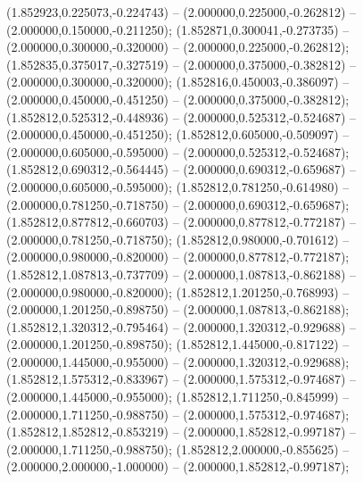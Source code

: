  (1.852923,0.225073,-0.224743) -- (2.000000,0.225000,-0.262812) -- (2.000000,0.150000,-0.211250);
 (1.852871,0.300041,-0.273735) -- (2.000000,0.300000,-0.320000) -- (2.000000,0.225000,-0.262812);
 (1.852835,0.375017,-0.327519) -- (2.000000,0.375000,-0.382812) -- (2.000000,0.300000,-0.320000);
 (1.852816,0.450003,-0.386097) -- (2.000000,0.450000,-0.451250) -- (2.000000,0.375000,-0.382812);
 (1.852812,0.525312,-0.448936) -- (2.000000,0.525312,-0.524687) -- (2.000000,0.450000,-0.451250);
 (1.852812,0.605000,-0.509097) -- (2.000000,0.605000,-0.595000) -- (2.000000,0.525312,-0.524687);
 (1.852812,0.690312,-0.564445) -- (2.000000,0.690312,-0.659687) -- (2.000000,0.605000,-0.595000);
 (1.852812,0.781250,-0.614980) -- (2.000000,0.781250,-0.718750) -- (2.000000,0.690312,-0.659687);
 (1.852812,0.877812,-0.660703) -- (2.000000,0.877812,-0.772187) -- (2.000000,0.781250,-0.718750);
 (1.852812,0.980000,-0.701612) -- (2.000000,0.980000,-0.820000) -- (2.000000,0.877812,-0.772187);
 (1.852812,1.087813,-0.737709) -- (2.000000,1.087813,-0.862188) -- (2.000000,0.980000,-0.820000);
 (1.852812,1.201250,-0.768993) -- (2.000000,1.201250,-0.898750) -- (2.000000,1.087813,-0.862188);
 (1.852812,1.320312,-0.795464) -- (2.000000,1.320312,-0.929688) -- (2.000000,1.201250,-0.898750);
 (1.852812,1.445000,-0.817122) -- (2.000000,1.445000,-0.955000) -- (2.000000,1.320312,-0.929688);
 (1.852812,1.575312,-0.833967) -- (2.000000,1.575312,-0.974687) -- (2.000000,1.445000,-0.955000);
 (1.852812,1.711250,-0.845999) -- (2.000000,1.711250,-0.988750) -- (2.000000,1.575312,-0.974687);
 (1.852812,1.852812,-0.853219) -- (2.000000,1.852812,-0.997187) -- (2.000000,1.711250,-0.988750);
 (1.852812,2.000000,-0.855625) -- (2.000000,2.000000,-1.000000) -- (2.000000,1.852812,-0.997187);
